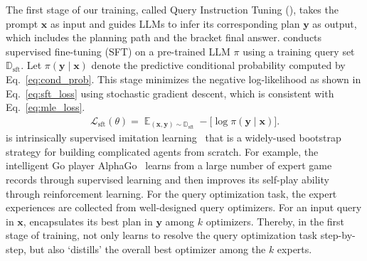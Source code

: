 The first stage of our training, called Query Instruction Tuning
(\QIT), takes the prompt $\bm{x}$ as input and guides LLMs to infer its corresponding plan $\bm{y}$ as output, which includes the planning path and the bracket final answer. 
\QIT conducts supervised fine-tuning (SFT) on a pre-trained LLM $\pi$ using a training query set $\mathbb{D}_{\mathrm{sft}}$. 
Let $\pi(\bm{y} \mid \bm{x})$ denote the predictive conditional probability computed by Eq.~\eqref{eq:cond_prob}. This stage minimizes the negative log-likelihood as shown in Eq.~\eqref{eq:sft_loss} using stochastic gradient descent, which is consistent with Eq.~\eqref{eq:mle_loss}. 
\begin{align}
    \label{eq:sft_loss}
    \mathcal{L}_{\mathrm{sft}}({\theta}) = \mathop{\mathbb{E}}_{( \bm{x}, \bm{y}) \sim \mathbb{D}_{\mathrm{sft}}} -\Big[ \log \pi(\bm{y} \mid \bm{x})\Big]\text{.}
\end{align}
\QIT is intrinsically supervised imitation learning~\cite{DBLP:journals/csur/HusseinGEJ17} that is a widely-used bootstrap strategy for building complicated agents from scratch.  
For example, the intelligent Go player AlphaGo~\cite{silver2016mastering} learns from a large number of expert game records through supervised learning and then improves its self-play ability through reinforcement learning.
For the query optimization task, the expert experiences are collected from well-designed query optimizers. 
For an input query in $\bm{x}$, \QueryInstruct encapsulates its best plan in $\bm{y}$ among $k$ optimizers. 
Thereby, in the first stage of training, \LLMQO not only learns to resolve the query optimization task step-by-step, but also `distills' the overall best optimizer among the $k$ experts. 

